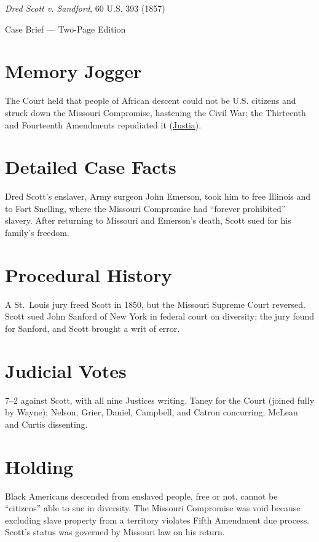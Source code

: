 \documentclass[12pt]{article}
\begin{document}
\begin{center}
{\LARGE \textit{Dred Scott v. Sandford}, 60 U.S. 393 (1857)\par}
\vspace{0.5em}
{\large Case Brief --- Two-Page Edition\par}
\end{center}

\section{Memory Jogger}
The Court held that people of African descent could not be U.S. citizens and struck down the Missouri Compromise, hastening the Civil War; the Thirteenth and Fourteenth Amendments repudiated it (\href{https://supreme.justia.com/cases/federal/us/60/393/}{Justia}).

\section{Detailed Case Facts}
Dred Scott's enslaver, Army surgeon John Emerson, took him to free Illinois and to Fort Snelling, where the Missouri Compromise had ``forever prohibited'' slavery. After returning to Missouri and Emerson's death, Scott sued for his family's freedom.

\section{Procedural History}
A St.\ Louis jury freed Scott in 1850, but the Missouri Supreme Court reversed. Scott sued John Sanford of New York in federal court on diversity; the jury found for Sanford, and Scott brought a writ of error.

\section{Judicial Votes}
7--2 against Scott, with all nine Justices writing. Taney for the Court (joined fully by Wayne); Nelson, Grier, Daniel, Campbell, and Catron concurring; McLean and Curtis dissenting.

\section{Holding}
Black Americans descended from enslaved people, free or not, cannot be ``citizens'' able to sue in diversity. The Missouri Compromise was void because excluding slave property from a territory violates Fifth Amendment due process. Scott's status was governed by Missouri law on his return.
\end{document}
